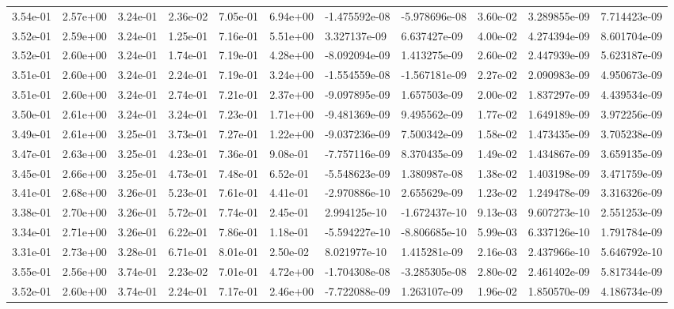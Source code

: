 \begin{longtable}{| p{} | p{} |}
3.54e-01 & 2.57e+00 & 3.24e-01 & 2.36e-02 & 7.05e-01 & 6.94e+00 & -1.475592e-08 & -5.978696e-08 &  3.60e-02 &  3.289855e-09 &  7.714423e-09 \\
3.52e-01 & 2.59e+00 & 3.24e-01 & 1.25e-01 & 7.16e-01 & 5.51e+00 &  3.327137e-09 &  6.637427e-09 &  4.00e-02 &  4.274394e-09 &  8.601704e-09 \\
3.52e-01 & 2.60e+00 & 3.24e-01 & 1.74e-01 & 7.19e-01 & 4.28e+00 & -8.092094e-09 &  1.413275e-09 &  2.60e-02 &  2.447939e-09 &  5.623187e-09 \\
3.51e-01 & 2.60e+00 & 3.24e-01 & 2.24e-01 & 7.19e-01 & 3.24e+00 & -1.554559e-08 & -1.567181e-09 &  2.27e-02 &  2.090983e-09 &  4.950673e-09 \\
3.51e-01 & 2.60e+00 & 3.24e-01 & 2.74e-01 & 7.21e-01 & 2.37e+00 & -9.097895e-09 &  1.657503e-09 &  2.00e-02 &  1.837297e-09 &  4.439534e-09 \\
3.50e-01 & 2.61e+00 & 3.24e-01 & 3.24e-01 & 7.23e-01 & 1.71e+00 & -9.481369e-09 &  9.495562e-09 &  1.77e-02 &  1.649189e-09 &  3.972256e-09 \\
3.49e-01 & 2.61e+00 & 3.25e-01 & 3.73e-01 & 7.27e-01 & 1.22e+00 & -9.037236e-09 &  7.500342e-09 &  1.58e-02 &  1.473435e-09 &  3.705238e-09 \\
3.47e-01 & 2.63e+00 & 3.25e-01 & 4.23e-01 & 7.36e-01 & 9.08e-01 & -7.757116e-09 &  8.370435e-09 &  1.49e-02 &  1.434867e-09 &  3.659135e-09 \\
3.45e-01 & 2.66e+00 & 3.25e-01 & 4.73e-01 & 7.48e-01 & 6.52e-01 & -5.548623e-09 &  1.380987e-08 &  1.38e-02 &  1.403198e-09 &  3.471759e-09 \\
3.41e-01 & 2.68e+00 & 3.26e-01 & 5.23e-01 & 7.61e-01 & 4.41e-01 & -2.970886e-10 &  2.655629e-09 &  1.23e-02 &  1.249478e-09 &  3.316326e-09 \\
3.38e-01 & 2.70e+00 & 3.26e-01 & 5.72e-01 & 7.74e-01 & 2.45e-01 &  2.994125e-10 & -1.672437e-10 &  9.13e-03 &  9.607273e-10 &  2.551253e-09 \\
3.34e-01 & 2.71e+00 & 3.26e-01 & 6.22e-01 & 7.86e-01 & 1.18e-01 & -5.594227e-10 & -8.806685e-10 &  5.99e-03 &  6.337126e-10 &  1.791784e-09 \\
3.31e-01 & 2.73e+00 & 3.28e-01 & 6.71e-01 & 8.01e-01 & 2.50e-02 &  8.021977e-10 &  1.415281e-09 &  2.16e-03 &  2.437966e-10 &  5.646792e-10 \\
3.55e-01 & 2.56e+00 & 3.74e-01 & 2.23e-02 & 7.01e-01 & 4.72e+00 & -1.704308e-08 & -3.285305e-08 &  2.80e-02 &  2.461402e-09 &  5.817344e-09 \\
3.52e-01 & 2.60e+00 & 3.74e-01 & 2.24e-01 & 7.17e-01 & 2.46e+00 & -7.722088e-09 &  1.263107e-09 &  1.96e-02 &  1.850570e-09 &  4.186734e-09 \\

\end{longtable}
